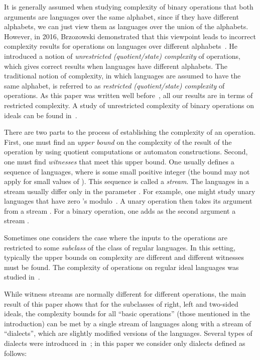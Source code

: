 \documentclass[final]{dmtcs-episciences}
\theoremstyle{definition}
\theoremstyle{remark}
\begin{document}
It is generally assumed when studying complexity of binary operations that both arguments are languages over the same alphabet, since if they have different alphabets, we can just view them as languages over the union of the alphabets.
However, in 2016, Brzozowski demonstrated that this viewpoint leads to incorrect complexity results for operations on languages over different alphabets~\cite{Brz16}. He introduced a notion of \emph{unrestricted (quotient/state) complexity} of operations, which gives correct results when languages have different alphabets. The traditional notion of complexity, in which languages are assumed to have the same alphabet, is referred to as \emph{restricted (quotient/state) complexity} of operations.
As this paper was written well before~\cite{Brz16}, all our results are in terms of restricted complexity.
A study of unrestricted complexity of binary operations on ideals can be found in~\cite{BrCo16}.

There are two parts to the process of  establishing the  complexity of an operation.
First, one must find an \emph{upper bound} on the  complexity of the result of the operation
by using quotient computations or automaton constructions.
Second, one must find \emph{witnesses}  that meet this upper bound.
One usually defines a sequence  of languages, where   is some small positive integer (the bound may not apply for small values of ).  This sequence is called a \emph{stream}. The languages  in a stream usually differ only in the parameter . 
For example, 
one might study unary languages  that have zero 's modulo~. 
A unary operation then takes its argument from a stream .
For a binary operation, one adds as the second argument a stream . 

Sometimes one considers the case where the inputs to the operations are restricted to some \emph{subclass} of the class of regular languages. In this setting, typically the upper bounds on complexity are different and different witnesses must be found. The complexity of operations on regular ideal languages was studied in~\cite{BJL13}.

While witness streams are normally different for different operations, the main result of this paper shows that for the subclasses of right, left and two-sided ideals, the complexity bounds for all ``basic operations'' (those mentioned in the introduction) can be met by a single stream of languages along with a stream of ``dialects'', which are slightly modified versions of the languages. Several types of dialects were introduced in~\cite{Brz13}; in this paper we consider only dialects defined as follows:
\end{document}
